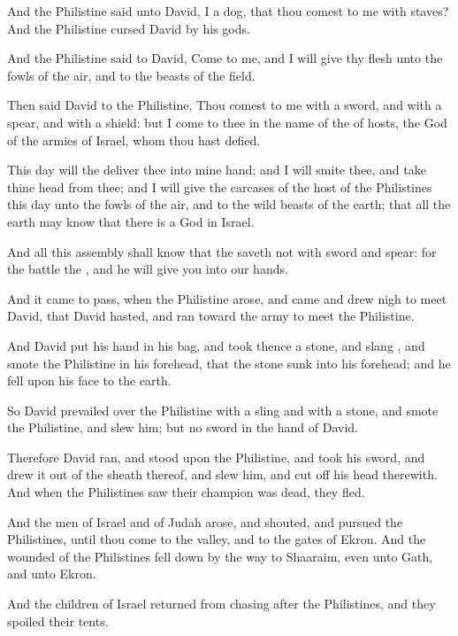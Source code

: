 {And the
Philistine
said unto
David,
{} I a
dog, that thou
comest to me with
staves? And the
Philistine
cursed
David by his
gods.

And the
Philistine
said to
David,
Come to me, and I will
give thy
flesh unto the
fowls of the
air, and to the
beasts of the
field.

Then
said
David to the
Philistine, Thou
comest to me with a
sword, and with a
spear, and with a
shield: but I
come to thee in the
name of the
{} of
hosts, the
God of the
armies of
Israel, whom thou hast
defied.

This
day will the
{}
deliver thee into mine
hand; and I will
smite thee, and
take thine
head from thee; and I will
give the
carcases of the
host of the
Philistines this
day unto the
fowls of the
air, and to the wild
beasts of the
earth; that all the
earth may
know that there
is a
God in
Israel.

And all this
assembly shall
know that the
{}
saveth not with
sword and
spear: for the
battle
{} the
{}, and he will
give you into our
hands.


\par }{\PP {}And it came to pass, when the
Philistine
arose, and
came and drew
nigh to
meet
David, that
David
hasted, and
ran toward the
army to
meet the
Philistine.

And
David
put his
hand in his
bag, and
took thence a
stone, and
slang
{}, and
smote the
Philistine in his
forehead, that the
stone
sunk into his
forehead; and he
fell upon his
face to the
earth.

So
David
prevailed
over the
Philistine with a
sling and with a
stone, and
smote the
Philistine, and
slew him; but
{} no
sword in the
hand of
David.

Therefore
David
ran, and
stood upon the
Philistine, and
took his
sword, and
drew it out of the
sheath thereof, and
slew him, and cut
off his
head therewith. And when the
Philistines
saw their
champion was
dead, they
fled.

And the
men of
Israel and of
Judah
arose, and
shouted, and
pursued the
Philistines, until thou
come to the
valley, and to the
gates of
Ekron. And the
wounded of the
Philistines fell
down by the
way to
Shaaraim, even unto
Gath, and unto
Ekron.

And the
children of
Israel
returned from
chasing
after the
Philistines, and they
spoiled their
tents.

}
